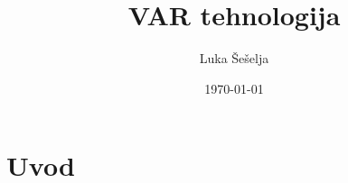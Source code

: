 \documentclass{article}
\title{VAR tehnologija}
\author{Luka Šešelja}
\date{\today}
\begin{document}
\maketitle

\section{Uvod}
\end{document}
